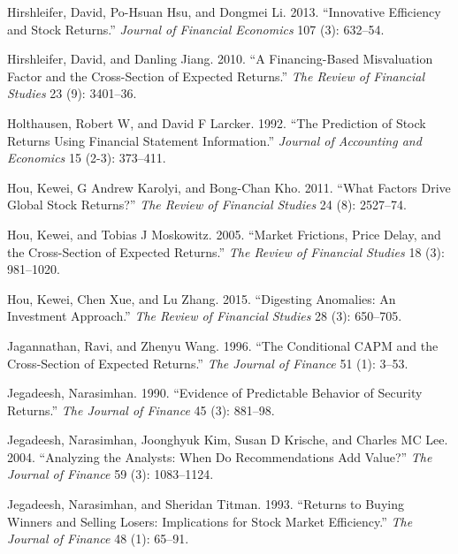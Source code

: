 \documentclass[
  letterpaper,
  DIV=11,
  numbers=noendperiod]{scrreprt}
\newlength{\cslhangindent}
\newlength{\cslentryspacingunit} %
\newenvironment{CSLReferences}[2] %
 {%
  \setlength{\parindent}{0pt}
  \ifodd #1
  \let\oldpar\par
  \def\par{\hangindent=\cslhangindent\oldpar}
  \fi
  \setlength{\parskip}{#2\cslentryspacingunit}
 }%
 {}
\begin{document}
\begin{CSLReferences}{1}{0}
\leavevmode{}%
Hirshleifer, David, Po-Hsuan Hsu, and Dongmei Li. 2013. {``Innovative
Efficiency and Stock Returns.''} \emph{Journal of Financial Economics}
107 (3): 632--54.

\leavevmode{}%
Hirshleifer, David, and Danling Jiang. 2010. {``A Financing-Based
Misvaluation Factor and the Cross-Section of Expected Returns.''}
\emph{The Review of Financial Studies} 23 (9): 3401--36.

\leavevmode{}%
Holthausen, Robert W, and David F Larcker. 1992. {``The Prediction of
Stock Returns Using Financial Statement Information.''} \emph{Journal of
Accounting and Economics} 15 (2-3): 373--411.

\leavevmode{}%
Hou, Kewei, G Andrew Karolyi, and Bong-Chan Kho. 2011. {``What Factors
Drive Global Stock Returns?''} \emph{The Review of Financial Studies} 24
(8): 2527--74.

\leavevmode{}%
Hou, Kewei, and Tobias J Moskowitz. 2005. {``Market Frictions, Price
Delay, and the Cross-Section of Expected Returns.''} \emph{The Review of
Financial Studies} 18 (3): 981--1020.

\leavevmode{}%
Hou, Kewei, Chen Xue, and Lu Zhang. 2015. {``Digesting Anomalies: An
Investment Approach.''} \emph{The Review of Financial Studies} 28 (3):
650--705.

\leavevmode{}%
Jagannathan, Ravi, and Zhenyu Wang. 1996. {``The Conditional CAPM and
the Cross-Section of Expected Returns.''} \emph{The Journal of Finance}
51 (1): 3--53.

\leavevmode{}%
Jegadeesh, Narasimhan. 1990. {``Evidence of Predictable Behavior of
Security Returns.''} \emph{The Journal of Finance} 45 (3): 881--98.

\leavevmode{}%
Jegadeesh, Narasimhan, Joonghyuk Kim, Susan D Krische, and Charles MC
Lee. 2004. {``Analyzing the Analysts: When Do Recommendations Add
Value?''} \emph{The Journal of Finance} 59 (3): 1083--1124.

\leavevmode{}%
Jegadeesh, Narasimhan, and Sheridan Titman. 1993. {``Returns to Buying
Winners and Selling Losers: Implications for Stock Market Efficiency.''}
\emph{The Journal of Finance} 48 (1): 65--91.


\end{CSLReferences}
\end{document}
